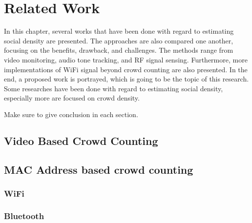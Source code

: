 \chapter{Related Work}\label{ch:related-work}


In this chapter, several works that have been done with regard to estimating social density are presented. The approaches are also compared one another, focusing on the benefits, drawback, and challenges. The methods range from video monitoring, audio tone tracking, and RF signal sensing. Furthermore, more implementations of WiFi signal beyond crowd counting are also presented. In the end, a proposed work is portrayed, which is going to be the topic of this research.
Some researches have been done with regard to estimating social density, especially more are focused on crowd density.

Make sure to give conclusion in each section.

\section{Video Based Crowd Counting} %
\label{sec:video_based_crowd_counting}




\section{MAC Address based crowd counting} %
\label{sec:mac_address_based_crowd_counting}

\subsection{WiFi} %
\label{sub:wifi}


\subsection{Bluetooth} %
\label{sub:bluetooth}

